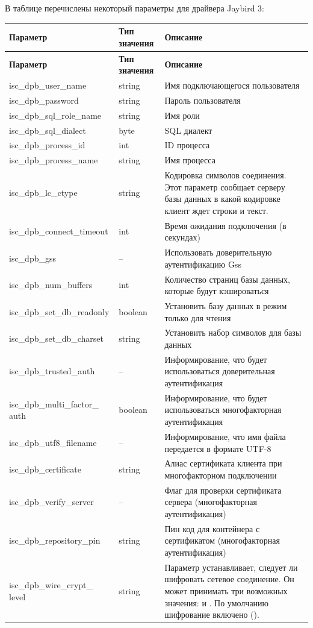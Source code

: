 В таблице перечислены некоторый параметры для драйвера Jaybird 3: \hypertarget{tab:01}{}
\begin{longtable}[c]{|>{\ttfamily}m{4.2cm}|>{\ttfamily\centering}m{1.7cm}|m{9.5cm}|}
	\hline
	\centering\normalfont\bfseries Параметр &
	\centering\normalfont\bfseries Тип значения&
	\centering\arraybslash\bfseries Описание\\\hline
	\endfirsthead
	\hline
	\centering\normalfont\bfseries Параметр &
	\centering\normalfont\bfseries Тип значения &
	\centering\arraybslash\bfseries Описание\\\hline
	\endhead
	isc\_dpb\_user\_name & string & Имя подключающегося пользователя\\\hline
	isc\_dpb\_password & string & Пароль пользователя\\\hline
	isc\_dpb\_sql\_role\_name & string & Имя роли\\\hline
	isc\_dpb\_sql\_dialect & byte & SQL диалект \\\hline
	isc\_dpb\_process\_id & int & ID процесса \\\hline
	isc\_dpb\_process\_name & string & Имя процесса \\\hline
	isc\_dpb\_lc\_ctype & string & Кодировка символов соединения. Этот параметр сообщает серверу базы данных в какой кодировке клиент ждет строки и текст.\\\hline
	isc\_dpb\_connect\_timeout & int & Время ожидания подключения (в секундах)\\\hline
	isc\_dpb\_gss & -- & Использовать доверительную аутентификацию Gss\\\hline
	isc\_dpb\_num\_buffers & int & Количество страниц базы данных, которые будут кэшироваться\\\hline
	isc\_dpb\_set\_db\_readonly & boolean & Установить базу данных в режим только для чтения\\\hline
	isc\_dpb\_set\_db\_charset & string & Установить набор символов для базы данных \\\hline
	isc\_dpb\_trusted\_auth & -- & Информирование, что будет использоваться доверительная аутентификация\\\hline
	isc\_dpb\_multi\_factor\_ auth & boolean &  Информирование, что будет использоваться многофакторная аутентификация\\\hline
	isc\_dpb\_utf8\_filename  & -- & Информирование, что имя файла передается в формате UTF-8\\\hline
	isc\_dpb\_certificate & string & Алиас сертификата клиента при многофакторном подключении\\\hline
	isc\_dpb\_verify\_server & -- & Флаг для проверки сертификата сервера (многофакторная аутентификация) \\\hline
	isc\_dpb\_repository\_pin & string & Пин код для контейнера с сертификатом (многофакторная аутентификация)\\\hline
	isc\_dpb\_wire\_crypt\_
	level & string & Параметр устанавливает, следует ли шифровать сетевое соединение. Он может принимать три	возможных значения: \ttt{REQUIRED, ENABLED, DISABLED} и \ttt{DEFAULT}. По умолчанию шифрование включено (\ttt{Enabled}).\\\hline
\end{longtable} 

